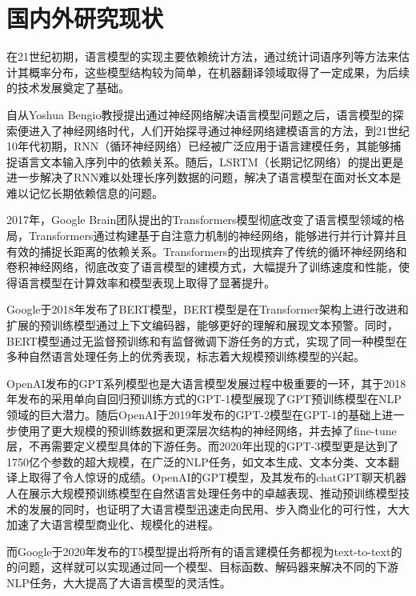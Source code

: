 \documentclass[
    decl-page,  %
    ,fontset = win, %
  ]{njuthesis}
\begin{document}
\section{国内外研究现状}
在21世纪初期，语言模型的实现主要依赖统计方法，通过统计词语序列等方法来估计其概率分布，这些模型结构较为简单，在机器翻译领域取得了一定成果，为后续的技术发展奠定了基础。

自从Yoshua Bengio教授提出通过神经网络解决语言模型问题之后\cite{bengio2000neural}，语言模型的探索便进入了神经网络时代，人们开始探寻通过神经网络建模语言的方法，到21世纪10年代初期，RNN（循环神经网络）\cite{mikolov2010recurrent}已经被广泛应用于语言建模任务，其能够捕捉语言文本输入序列中的依赖关系。随后，LSRTM（长期记忆网络）\cite{hochreiter1997long}的提出更是进一步解决了RNN难以处理长序列数据的问题，解决了语言模型在面对长文本是难以记忆长期依赖信息的问题。

2017年，Google Brain团队提出的Transformers模型\cite{vaswani2017attention}彻底改变了语言模型领域的格局，Transformers通过构建基于自注意力机制的神经网络，能够进行并行计算并且有效的捕捉长距离的依赖关系。Transformers的出现摈弃了传统的循环神经网络和卷积神经网络，彻底改变了语言模型的建模方式，大幅提升了训练速度和性能，使得语言模型在计算效率和模型表现上取得了显著提升。

Google于2018年发布了BERT模型\cite{devlin2018bert}，BERT模型是在Transformer架构上进行改进和扩展的预训练模型通过上下文编码器，能够更好的理解和展现文本预警。同时，BERT模型通过无监督预训练和有监督微调下游任务的方式，实现了同一种模型在多种自然语言处理任务上的优秀表现，标志着大规模预训练模型的兴起。

OpenAI发布的GPT系列模型也是大语言模型发展过程中极重要的一环，其于2018年发布的采用单向自回归预训练方式的GPT-1模型\cite{radford2018improving}展现了GPT预训练模型在NLP领域的巨大潜力。随后OpenAI于2019年发布的GPT-2模型\cite{radford2019language}在GPT-1的基础上进一步使用了更大规模的预训练数据和更深层次结构的神经网络，并去掉了fine-tune层，不再需要定义模型具体的下游任务。而2020年出现的GPT-3模型\cite{brown2020language}更是达到了1750亿个参数的超大规模，在广泛的NLP任务，如文本生成、文本分类、文本翻译上取得了令人惊讶的成绩。OpenAI的GPT模型，及其发布的chatGPT聊天机器人在展示大规模预训练模型在自然语言处理任务中的卓越表现、推动预训练模型技术的发展的同时，也证明了大语言模型迅速走向民用、步入商业化的可行性，大大加速了大语言模型商业化、规模化的进程。

而Google于2020年发布的T5模型\cite{raffel2020exploring}提出将所有的语言建模任务都视为text-to-text的的问题，这样就可以实现通过同一个模型、目标函数、解码器来解决不同的下游NLP任务，大大提高了大语言模型的灵活性。
\end{document}

